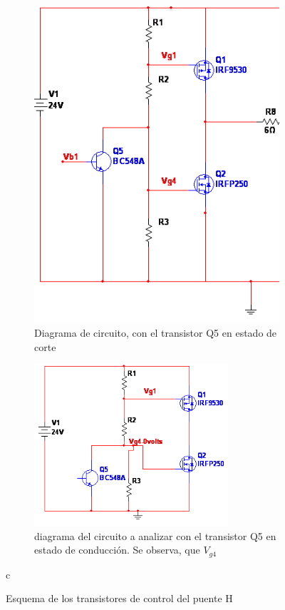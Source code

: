 \begin{figure}[ht!]
	\begin{subfigure}{0.45\linewidth}
		\includegraphics[scale=0.5]{analisis_rama_puente_1}
		\caption{Diagrama de circuito, con el transistor Q5 en estado de corte}
		\label{fig:bjt_cortado}
	\end{subfigure}
\hfill 
	\begin{subfigure}{0.5\linewidth}
	\includegraphics[height=6cm]{analisis_rama2_puente_1}
		\caption{diagrama del circuito a analizar con el transistor Q5 en estado de conducción. Se observa, que $V_{g4}$ }
		\label{fig:q_cortado}
	\end{subfigure}c
\caption{Esquema de los transistores de control del puente H}
\end{figure}

